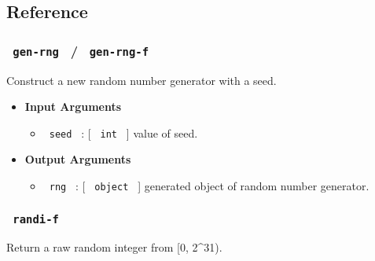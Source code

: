 \subsection{Reference}\label{reference}

\subsubsection{\texorpdfstring{\texttt{\ gen-rng\ } /
\texttt{\ gen-rng-f\ }}{ gen-rng  /  gen-rng-f }}\label{gen-rng-gen-rng-f}

Construct a new random number generator with a seed.

\begin{Shaded}
\begin{Highlighting}[]
\end{Highlighting}
\end{Shaded}

\begin{itemize}
\item
  \textbf{Input Arguments}

  \begin{itemize}
  \tightlist
  \item
    \texttt{\ seed\ } : {[} \texttt{\ int\ } {]} value of seed.
  \end{itemize}
\item
  \textbf{Output Arguments}

  \begin{itemize}
  \tightlist
  \item
    \texttt{\ rng\ } : {[} \texttt{\ object\ } {]} generated object of
    random number generator.
  \end{itemize}
\end{itemize}

\subsubsection{\texorpdfstring{\texttt{\ randi-f\ }}{ randi-f }}\label{randi-f}

Return a raw random integer from {[}0, 2\^{}31).

\begin{Shaded}
\begin{Highlighting}[]
\end{Highlighting}
\end{Shaded}

